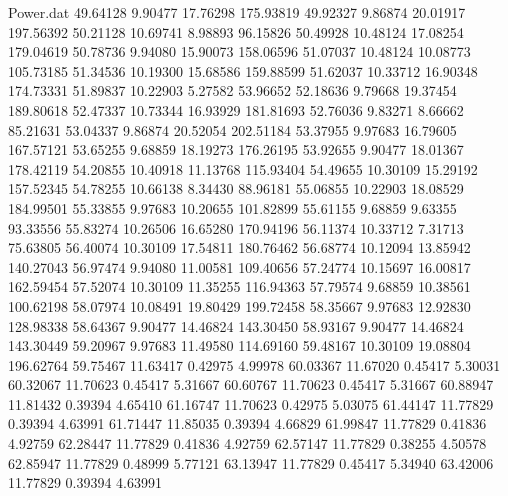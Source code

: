 \begin{filecontents}{Power.dat}
  49.64128    9.90477   17.76298  175.93819
  49.92327    9.86874   20.01917  197.56392
  50.21128   10.69741    8.98893   96.15826
  50.49928   10.48124   17.08254  179.04619
  50.78736    9.94080   15.90073  158.06596
  51.07037   10.48124   10.08773  105.73185
  51.34536   10.19300   15.68586  159.88599
  51.62037   10.33712   16.90348  174.73331
  51.89837   10.22903    5.27582   53.96652
  52.18636    9.79668   19.37454  189.80618
  52.47337   10.73344   16.93929  181.81693
  52.76036    9.83271    8.66662   85.21631
  53.04337    9.86874   20.52054  202.51184
  53.37955    9.97683   16.79605  167.57121
  53.65255    9.68859   18.19273  176.26195
  53.92655    9.90477   18.01367  178.42119
  54.20855   10.40918   11.13768  115.93404
  54.49655   10.30109   15.29192  157.52345
  54.78255   10.66138    8.34430   88.96181
  55.06855   10.22903   18.08529  184.99501
  55.33855    9.97683   10.20655  101.82899
  55.61155    9.68859    9.63355   93.33556
  55.83274   10.26506   16.65280  170.94196
  56.11374   10.33712    7.31713   75.63805
  56.40074   10.30109   17.54811  180.76462
  56.68774   10.12094   13.85942  140.27043
  56.97474    9.94080   11.00581  109.40656
  57.24774   10.15697   16.00817  162.59454
  57.52074   10.30109   11.35255  116.94363
  57.79574    9.68859   10.38561  100.62198
  58.07974   10.08491   19.80429  199.72458
  58.35667    9.97683   12.92830  128.98338
  58.64367    9.90477   14.46824  143.30450
  58.93167    9.90477   14.46824  143.30449
  59.20967    9.97683   11.49580  114.69160
  59.48167   10.30109   19.08804  196.62764
  59.75467   11.63417    0.42975    4.99978
  60.03367   11.67020    0.45417    5.30031
  60.32067   11.70623    0.45417    5.31667
  60.60767   11.70623    0.45417    5.31667
  60.88947   11.81432    0.39394    4.65410
  61.16747   11.70623    0.42975    5.03075
  61.44147   11.77829    0.39394    4.63991
  61.71447   11.85035    0.39394    4.66829
  61.99847   11.77829    0.41836    4.92759
  62.28447   11.77829    0.41836    4.92759
  62.57147   11.77829    0.38255    4.50578
  62.85947   11.77829    0.48999    5.77121
  63.13947   11.77829    0.45417    5.34940
  63.42006   11.77829    0.39394    4.63991
\end{filecontents}
